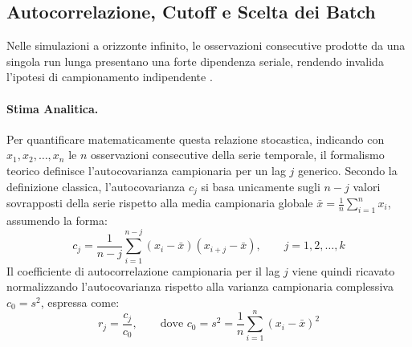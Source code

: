 ﻿\documentclass[a4paper,12pt]{article}
\begin{document}
\subsection{Autocorrelazione, Cutoff e Scelta dei Batch}
Nelle simulazioni a orizzonte infinito, le osservazioni consecutive prodotte da una singola run lunga presentano una forte dipendenza seriale, rendendo invalida l'ipotesi di campionamento indipendente \cite{leemis-park-book}.

\paragraph{Stima Analitica.}
Per quantificare matematicamente questa relazione stocastica, indicando con $x_1, x_2, \dots, x_n$ le $n$ osservazioni consecutive della serie temporale, il formalismo teorico definisce l'autocovarianza campionaria per un lag $j$ generico. Secondo la definizione classica, l'autocovarianza $c_j$ si basa unicamente sugli $n-j$ valori sovrapposti della serie rispetto alla media campionaria globale $\bar{x} = \frac{1}{n}\sum_{i=1}^{n}x_i$, assumendo la forma:
\begin{equation}
    c_j = \frac{1}{n-j}\sum_{i=1}^{n-j}(x_i-\bar{x})(x_{i+j}-\bar{x}), \qquad j = 1, 2, \dots, k
\end{equation}
Il coefficiente di autocorrelazione campionaria per il lag $j$ viene quindi ricavato normalizzando l'autocovarianza rispetto alla varianza campionaria complessiva $c_0 = s^2$, espressa come:
\begin{equation}
    r_j = \frac{c_j}{c_0}, \qquad \text{dove } c_0 = s^2 = \frac{1}{n}\sum_{i=1}^{n}(x_i-\bar{x})^2
\end{equation}
\end{document}
